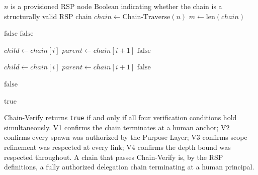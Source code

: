 \begin{algorithm}
\caption{Chain-Verify($n$) --- Verify the authorization chain from node $n$ to human anchor}
\label{alg:chain-verify}
\begin{algorithmic}[1]
\REQUIRE $n$ is a provisioned RSP node
\ENSURE $\text{Boolean}$ indicating whether the chain is a structurally valid RSP chain
\STATE $chain \leftarrow \text{Chain-Traverse}(n)$
\STATE $m \leftarrow \text{len}(chain)$

\STATE {}
    \STATE \RETURN $\text{false}$ 
\ENDIF
{}
    \STATE \RETURN $\text{false}$ 
\ENDIF

\STATE {}
    \STATE $child \leftarrow chain[i]$
    \STATE $parent \leftarrow chain[i+1]$
        \STATE \RETURN $\text{false}$ 
    \ENDIF
\ENDFOR

\STATE {}
    \STATE $child \leftarrow chain[i]$
    \STATE $parent \leftarrow chain[i+1]$
        \STATE \RETURN $\text{false}$ 
    \ENDIF
\ENDFOR

\STATE {}
        \STATE \RETURN $\text{false}$ 
    \ENDIF
\ENDFOR

\RETURN $\text{true}$
\end{algorithmic}
\end{algorithm}

Chain-Verify returns \texttt{true} if and only if all four verification conditions hold simultaneously. V1 confirms the chain terminates at a human anchor; V2 confirms every spawn was authorized by the Purpose Layer; V3 confirms scope refinement was respected at every link; V4 confirms the depth bound was respected throughout. A chain that passes Chain-Verify is, by the RSP definitions, a fully authorized delegation chain terminating at a human principal.

